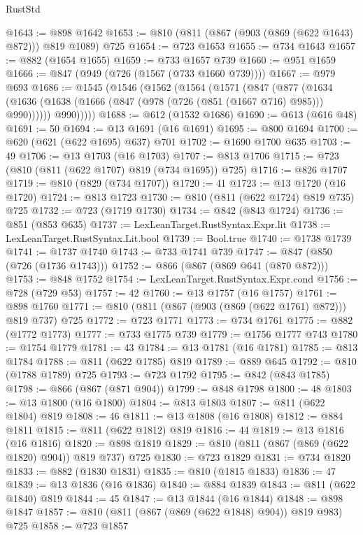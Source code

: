 \begin{lexlean}{RustStd}
\begin{coremodule}
@1643 := @898 @1642
@1653 := @810 (@811 (@867 (@903 (@869 (@622 @1643) @872))) @819 @1089) @725
@1654 := @723 @1653
@1655 := @734 @1643
@1657 := @882 (@1654 @1655)
@1659 := @733 @1657 @739
@1660 := @951 @1659
@1666 := @847 (@949 (@726 (@1567 (@733 @1660 @739))))
@1667 := @979 @693
@1686 := @1545
    (@1546
      (@1562
        (@1564
          (@1571
            (@847
              (@877
                (@1634 (@1636 (@1638 (@1666 (@847 (@978 (@726 (@851 (@1667 @716) @985))) @990))))))
              @990)))))
@1688 := @612 (@1532 @1686)
@1690 := @613 (@616 @48)
@1691 := 50
@1694 := @13 @1691 (@16 @1691)
@1695 := @800 @1694
@1700 := @620 (@621 (@622 @1695) @637) @701
@1702 := @1690 @1700 @635
@1703 := 49
@1706 := @13 @1703 (@16 @1703)
@1707 := @813 @1706
@1715 := @723 (@810 (@811 (@622 @1707) @819 (@734 @1695)) @725)
@1716 := @826 @1707
@1719 := @810 (@829 (@734 @1707))
@1720 := 41
@1723 := @13 @1720 (@16 @1720)
@1724 := @813 @1723
@1730 := @810 (@811 (@622 @1724) @819 @735) @725
@1732 := @723 (@1719 @1730)
@1734 := @842 (@843 @1724)
@1736 := @851 (@853 @635)
@1737 := LexLeanTarget.RustSyntax.Expr.lit
@1738 := LexLeanTarget.RustSyntax.Lit.bool
@1739 := Bool.true
@1740 := @1738 @1739
@1741 := @1737 @1740
@1743 := @733 @1741 @739
@1747 := @847 (@850 (@726 (@1736 @1743)))
@1752 := @866 (@867 (@869 @641 (@870 @872)))
@1753 := @848 @1752
@1754 := LexLeanTarget.RustSyntax.Expr.cond
@1756 := @728 (@729 @53)
@1757 := 42
@1760 := @13 @1757 (@16 @1757)
@1761 := @898 @1760
@1771 := @810 (@811 (@867 (@903 (@869 (@622 @1761) @872))) @819 @737) @725
@1772 := @723 @1771
@1773 := @734 @1761
@1775 := @882 (@1772 @1773)
@1777 := @733 @1775 @739
@1779 := @1756 @1777 @743
@1780 := @1754 @1779
@1781 := 43
@1784 := @13 @1781 (@16 @1781)
@1785 := @813 @1784
@1788 := @811 (@622 @1785) @819
@1789 := @889 @645
@1792 := @810 (@1788 @1789) @725
@1793 := @723 @1792
@1795 := @842 (@843 @1785)
@1798 := @866 (@867 (@871 @904))
@1799 := @848 @1798
@1800 := 48
@1803 := @13 @1800 (@16 @1800)
@1804 := @813 @1803
@1807 := @811 (@622 @1804) @819
@1808 := 46
@1811 := @13 @1808 (@16 @1808)
@1812 := @884 @1811
@1815 := @811 (@622 @1812) @819
@1816 := 44
@1819 := @13 @1816 (@16 @1816)
@1820 := @898 @1819
@1829 := @810 (@811 (@867 (@869 (@622 @1820) @904)) @819 @737) @725
@1830 := @723 @1829
@1831 := @734 @1820
@1833 := @882 (@1830 @1831)
@1835 := @810 (@1815 @1833)
@1836 := 47
@1839 := @13 @1836 (@16 @1836)
@1840 := @884 @1839
@1843 := @811 (@622 @1840) @819
@1844 := 45
@1847 := @13 @1844 (@16 @1844)
@1848 := @898 @1847
@1857 := @810 (@811 (@867 (@869 (@622 @1848) @904)) @819 @983) @725
@1858 := @723 @1857

\end{coremodule}
\end{lexlean}

